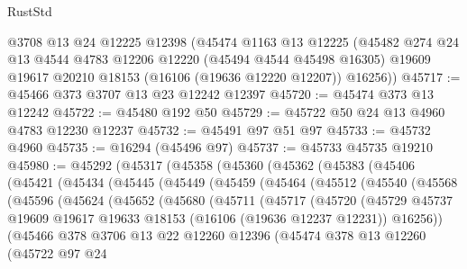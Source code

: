 \begin{lexlean}{RustStd}
\begin{coremodule}
    @3708
    @13
    @24
    @12225
    @12398
    (@45474
      @1163
      @13
      @12225
      (@45482
        @274
        @24
        @13
        @4544
        @4783
        @12206
        @12220
        (@45494 @4544 @45498 @16305)
        @19609
        @19617
        @20210
        @18153
        (@16106 (@19636 @12220 @12207))
        @16256))
@45717 := @45466 @373 @3707 @13 @23 @12242 @12397
@45720 := @45474 @373 @13 @12242
@45722 := @45480 @192 @50
@45729 := @45722 @50 @24 @13 @4960 @4783 @12230 @12237
@45732 := @45491 @97 @51 @97
@45733 := @45732 @4960
@45735 := @16294 (@45496 @97)
@45737 := @45733 @45735 @19210
@45980 := @45292
    (@45317
      (@45358
        (@45360
          (@45362
            (@45383
              (@45406
                (@45421
                  (@45434
                    (@45445
                      (@45449
                        (@45459
                          (@45464
                            (@45512
                              (@45540
                                (@45568
                                  (@45596
                                    (@45624
                                      (@45652
                                        (@45680
                                          (@45711
                                            (@45717
                                              (@45720
                                                (@45729
                                                  @45737
                                                  @19609
                                                  @19617
                                                  @19633
                                                  @18153
                                                  (@16106 (@19636 @12237 @12231))
                                                  @16256))
                                              (@45466
                                                @378
                                                @3706
                                                @13
                                                @22
                                                @12260
                                                @12396
                                                (@45474
                                                  @378
                                                  @13
                                                  @12260
                                                  (@45722
                                                    @97
                                                    @24

\end{coremodule}
\end{lexlean}
